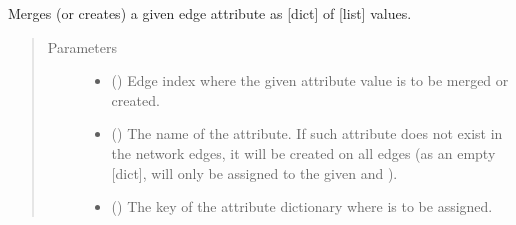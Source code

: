 \documentclass[letterpaper,10pt,english]{sphinxmanual}
\begin{document}
\begin{fulllineitems}
\begin{quote}
\begin{description}
\begin{itemize}
\end{itemize}

\end{description}\end{quote}

\begin{fulllineitems}
\label{\detokenize{main:pypath.main.PyPath.acsn_effects}}
\end{fulllineitems}


\begin{fulllineitems}
\label{\detokenize{main:pypath.main.PyPath.add_genesets}}
\end{fulllineitems}


\begin{fulllineitems}
\label{\detokenize{main:pypath.main.PyPath.add_grouped_eattr}}
Merges (or creates) a given edge attribute as {[}dict{]} of {[}list{]}
values.
\begin{quote}\begin{description}
\item[{Parameters}] \leavevmode\begin{itemize}
\item {} 
 () \textendash{} Edge index where the given attribute value is to be merged
or created.

\item {} 
 () \textendash{} The name of the attribute. If such attribute does not exist
in the network edges, it will be created on all edges (as an
empty {[}dict{]},  will only be assigned to the given
 and ).

\item {} 
 () \textendash{} The key of the attribute dictionary where  is to be
assigned.


\end{itemize}
\end{description}
\end{quote}
\end{fulllineitems}
\end{fulllineitems}
\end{document}
